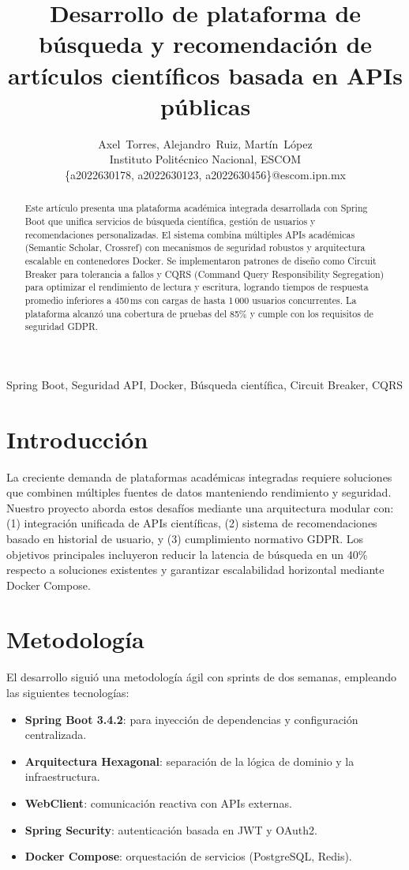 \documentclass[10pt,journal]{IEEEtran}
\title{Desarrollo de plataforma de búsqueda y recomendación de artículos científicos basada en APIs públicas}
\author{Axel~Torres, Alejandro~Ruiz, Martín~López\\
Instituto Politécnico Nacional, ESCOM\\
\{a2022630178, a2022630123, a2022630456\}@escom.ipn.mx}
\begin{document}
\maketitle

\begin{abstract}
Este artículo presenta una plataforma académica integrada desarrollada con Spring Boot que unifica servicios de búsqueda científica, gestión de usuarios y recomendaciones personalizadas. El sistema combina múltiples APIs académicas (Semantic Scholar, Crossref) con mecanismos de seguridad robustos y arquitectura escalable en contenedores Docker. Se implementaron patrones de diseño como Circuit Breaker para tolerancia a fallos y CQRS (Command Query Responsibility Segregation) para optimizar el rendimiento de lectura y escritura, logrando tiempos de respuesta promedio inferiores a 450\,ms con cargas de hasta 1\,000 usuarios concurrentes. La plataforma alcanzó una cobertura de pruebas del 85\% y cumple con los requisitos de seguridad GDPR.
\end{abstract}

\begin{IEEEkeywords}
Spring Boot, Seguridad API, Docker, Búsqueda científica, Circuit Breaker, CQRS
\end{IEEEkeywords}

\section{Introducción}
La creciente demanda de plataformas académicas integradas requiere soluciones que combinen múltiples fuentes de datos manteniendo rendimiento y seguridad. Nuestro proyecto aborda estos desafíos mediante una arquitectura modular con: (1) integración unificada de APIs científicas, (2) sistema de recomendaciones basado en historial de usuario, y (3) cumplimiento normativo GDPR. Los objetivos principales incluyeron reducir la latencia de búsqueda en un 40\% respecto a soluciones existentes y garantizar escalabilidad horizontal mediante Docker Compose.

\section{Metodología}
El desarrollo siguió una metodología ágil con sprints de dos semanas, empleando las siguientes tecnologías:
\begin{itemize}
  \item \textbf{Spring Boot 3.4.2}: para inyección de dependencias y configuración centralizada.
  \item \textbf{Arquitectura Hexagonal}: separación de la lógica de dominio y la infraestructura.
  \item \textbf{WebClient}: comunicación reactiva con APIs externas.
  \item \textbf{Spring Security}: autenticación basada en JWT y OAuth2.
  \item \textbf{Docker Compose}: orquestación de servicios (PostgreSQL, Redis).
\end{itemize}
\end{document}
